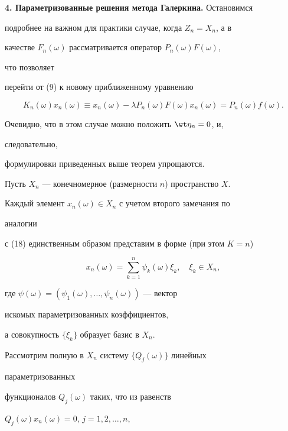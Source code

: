 {\bf 4. Параметризованные решения метода Галеркина.} Остановимся


подробнее на важном для практики случае, когда $Z_n=X_n$, а в


качестве $F_n(\omega)$ рассматривается оператор $P_n(\omega)F(\omega)$,


что позволяет


перейти от (9) к новому приближенному уравнению


\begin{equation}


K_n(\omega)x_n(\omega)\equiv x_n(\omega)-


\lambda P_n(\omega)F(\omega)x_n(\omega)=


P_n(\omega)f(\omega).


\end{equation}


Очевидно, что в этом случае можно положить $\wt\eta_n=0$, и,


следовательно,


формулировки приведенных выше теорем упрощаются.





Пусть $X_n$ --- конечномерное (размерности $n$) пространство $X$.


Каждый элемент $x_n(\omega)\in X_n$ с учетом второго замечания по


аналогии


с (18) единственным образом представим в форме (при этом $K=n$)


\begin{equation}


x_n(\omega)=\sum^n_{k=1}\psi_k(\omega)\xi_k,\quad \xi_k\in X_n,


\end{equation}


где $\psi(\omega)=(\psi_1(\omega),\dotsc,\psi_n(\omega))$ --- вектор


искомых параметризованных коэффициентов,


а совокупность $\{\xi_k\}$ образует базис в $X_n$.





Рассмотрим полную в $X_n$ систему $\{Q_j(\omega)\}$ линейных


параметризованных


функционалов $Q_j(\omega)$ таких, что из равенств


$Q_j(\omega)x_n(\omega)=0$, $j=1,2,\dotsc,n$,


